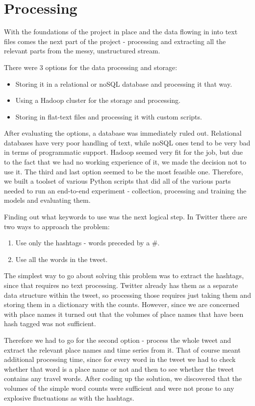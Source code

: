 \documentclass[minf,twoside,singlespacing,parskip,notimes,deptreport]{infthesis} %
\begin{document}
\section{Processing}


With the foundations of the project in place and the data flowing in into text files comes the next part of the project - processing and extracting all the relevant parts from the messy, unstructured stream. 

There were 3 options for the data processing and storage:
\begin{itemize}
\item Storing it in a relational or noSQL database and processing it that way. 
\item Using a Hadoop cluster for the storage and processing. 
\item Storing in flat-text files and processing it with custom scripts.
\end{itemize}

After evaluating the options, a database was immediately ruled out. Relational databases have very poor handling of text, while noSQL ones tend to be very bad in terms of programmatic support. Hadoop seemed very fit for the job, but due to the fact that we had no working experience of it, we made the decision not to use it. The third and last option seemed to be the most feasible one. Therefore, we built a toolset of various Python scripts that did all of the various parts needed to run an end-to-end experiment - collection, processing and training the models and evaluating them. 


Finding out what keywords to use was the next logical step. In Twitter there are two ways to approach the problem:
\begin{enumerate}
\item Use only the hashtags  - words preceded by a \#.
\item Use all the words in the tweet.
\end{enumerate}

The simplest way to go about solving this problem was to extract the hashtags, since that requires no text processing. Twitter already has them as a separate data structure within the tweet, so processing those requires just taking them and storing them in a dictionary with the counts. However, since we are concerned with place names it turned out that the volumes of place names that have been hash tagged was not sufficient.

Therefore we had to go for the second option - process the whole tweet and extract the relevant place names and time series from it. That of course meant additional processing time, since for every word in the tweet we had to check whether that word is a place name or not and then to see whether the tweet contains any travel words. After coding up the solution, we discovered that the volumes of the simple word counts were sufficient and were not prone to any explosive fluctuations as with the hashtags.
\end{document}

